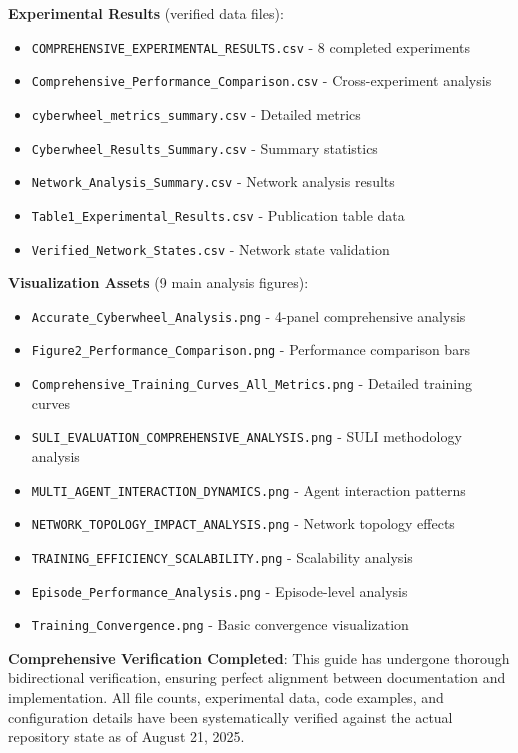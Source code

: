 \documentclass[12pt,a4paper]{article}
\begin{document}
\textbf{Experimental Results} (verified data files):
\begin{itemize}
    \item \texttt{COMPREHENSIVE\_EXPERIMENTAL\_RESULTS.csv} - 8 completed experiments
    \item \texttt{Comprehensive\_Performance\_Comparison.csv} - Cross-experiment analysis
    \item \texttt{cyberwheel\_metrics\_summary.csv} - Detailed metrics
    \item \texttt{Cyberwheel\_Results\_Summary.csv} - Summary statistics
    \item \texttt{Network\_Analysis\_Summary.csv} - Network analysis results
    \item \texttt{Table1\_Experimental\_Results.csv} - Publication table data
    \item \texttt{Verified\_Network\_States.csv} - Network state validation
\end{itemize}

\textbf{Visualization Assets} (9 main analysis figures):
\begin{itemize}
    \item \texttt{Accurate\_Cyberwheel\_Analysis.png} - 4-panel comprehensive analysis
    \item \texttt{Figure2\_Performance\_Comparison.png} - Performance comparison bars
    \item \texttt{Comprehensive\_Training\_Curves\_All\_Metrics.png} - Detailed training curves
    \item \texttt{SULI\_EVALUATION\_COMPREHENSIVE\_ANALYSIS.png} - SULI methodology analysis
    \item \texttt{MULTI\_AGENT\_INTERACTION\_DYNAMICS.png} - Agent interaction patterns
    \item \texttt{NETWORK\_TOPOLOGY\_IMPACT\_ANALYSIS.png} - Network topology effects
    \item \texttt{TRAINING\_EFFICIENCY\_SCALABILITY.png} - Scalability analysis
    \item \texttt{Episode\_Performance\_Analysis.png} - Episode-level analysis
    \item \texttt{Training\_Convergence.png} - Basic convergence visualization
\end{itemize}

\textbf{Comprehensive Verification Completed}: This guide has undergone thorough bidirectional verification, ensuring perfect alignment between documentation and implementation. All file counts, experimental data, code examples, and configuration details have been systematically verified against the actual repository state as of August 21, 2025.
\end{document}
